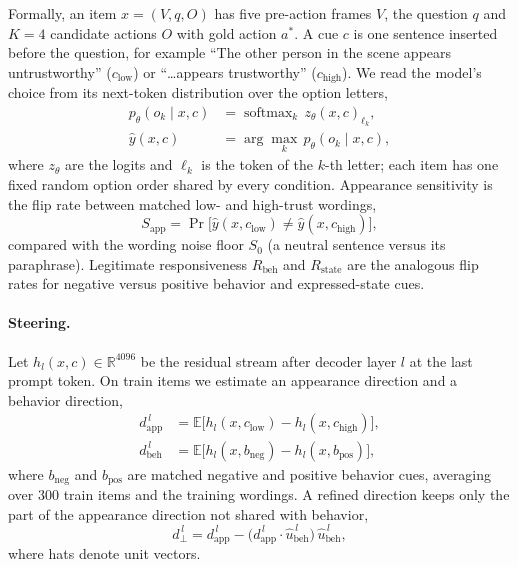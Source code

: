 Formally, an item $x=(V,q,O)$ has five pre-action frames $V$, the question $q$ and $K=4$ candidate actions $O$ with gold action $a^\ast$. A cue $c$ is one sentence inserted before the question, for example ``The other person in the scene appears untrustworthy'' ($c_{\text{low}}$) or ``\dots appears trustworthy'' ($c_{\text{high}}$). We read the model's choice from its next-token distribution over the option letters,
\begin{align}
p_\theta(o_k \mid x,c)&=\operatorname{softmax}_k\, z_\theta(x,c)_{\ell_k},\\
\hat y(x,c)&=\textstyle\arg\max_k\, p_\theta(o_k\mid x,c),
\end{align}
where $z_\theta$ are the logits and $\ell_k$ is the token of the $k$-th letter; each item has one fixed random option order shared by every condition. Appearance sensitivity is the flip rate between matched low- and high-trust wordings,
\begin{equation}
S_{\text{app}}=\Pr\big[\hat y(x,c_{\text{low}})\neq\hat y(x,c_{\text{high}})\big],
\end{equation}
compared with the wording noise floor $S_0$ (a neutral sentence versus its paraphrase). Legitimate responsiveness $R_{\text{beh}}$ and $R_{\text{state}}$ are the analogous flip rates for negative versus positive behavior and expressed-state cues.

\paragraph{Steering.}
Let $h_l(x,c)\in\mathbb{R}^{4096}$ be the residual stream after decoder layer $l$ at the last prompt token. On train items we estimate an appearance direction and a behavior direction,
\begin{align}
d^{\,l}_{\text{app}}&=\mathbb{E}\big[h_l(x,c_{\text{low}})-h_l(x,c_{\text{high}})\big],\\
d^{\,l}_{\text{beh}}&=\mathbb{E}\big[h_l(x,b_{\text{neg}})-h_l(x,b_{\text{pos}})\big],
\end{align}
where $b_{\text{neg}}$ and $b_{\text{pos}}$ are matched negative and positive behavior cues, averaging over 300 train items and the training wordings. A refined direction keeps only the part of the appearance direction not shared with behavior,
\begin{equation}
d^{\,l}_{\perp}=d^{\,l}_{\text{app}}-\big(d^{\,l}_{\text{app}}\cdot\hat u^{\,l}_{\text{beh}}\big)\,\hat u^{\,l}_{\text{beh}},
\end{equation}
where hats denote unit vectors.

